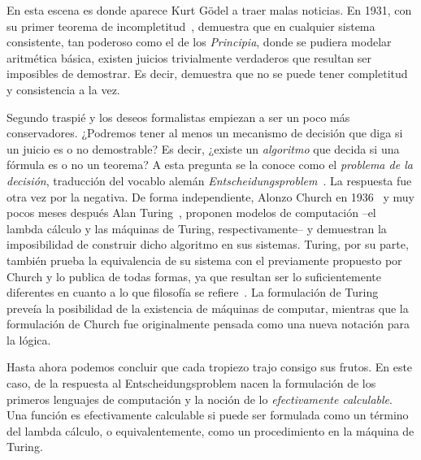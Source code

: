 En esta escena es donde aparece Kurt Gödel a traer malas noticias. En 1931, con su primer teorema de incompletitud~, demuestra que en cualquier sistema consistente, tan poderoso como el de los {\it Principia}, donde se pudiera modelar aritmética básica, existen juicios trivialmente verdaderos que resultan ser imposibles de demostrar. Es decir, demuestra que no se puede tener completitud y consistencia a la vez.

Segundo traspié y los deseos formalistas empiezan a ser un poco más conservadores. ¿Podremos tener al menos un mecanismo de decisión que diga si un juicio es o no demostrable? Es decir, ¿existe un {\it algoritmo} que decida si una fórmula es o no un teorema? A esta pregunta se la conoce como el {\it problema de la decisión}, traducción del vocablo alemán {\it Entscheidungsproblem}~. La respuesta fue otra vez por la negativa. De forma independiente, Alonzo Church en 1936~ y muy pocos meses después Alan Turing~, proponen modelos de computación --el lambda cálculo y las máquinas de Turing, respectivamente-- y demuestran la imposibilidad de construir dicho algoritmo en sus sistemas. Turing, por su parte, también prueba la equivalencia de su sistema con el previamente propuesto por Church y lo publica de todas formas, ya que resultan ser lo suficientemente diferentes en cuanto a lo que filosofía se refiere~. La formulación de Turing preveía la posibilidad de la existencia de máquinas de computar, mientras que la formulación de Church fue originalmente pensada como una nueva notación para la lógica.

Hasta ahora podemos concluir que cada tropiezo trajo consigo sus frutos. En este caso, de la respuesta al Entscheidungsproblem nacen la formulación de los primeros lenguajes de computación y la noción de lo {\it efectivamente calculable}. Una función es efectivamente calculable si puede ser formulada como un término del lambda cálculo, o equivalentemente, como un procedimiento en la máquina de Turing.

